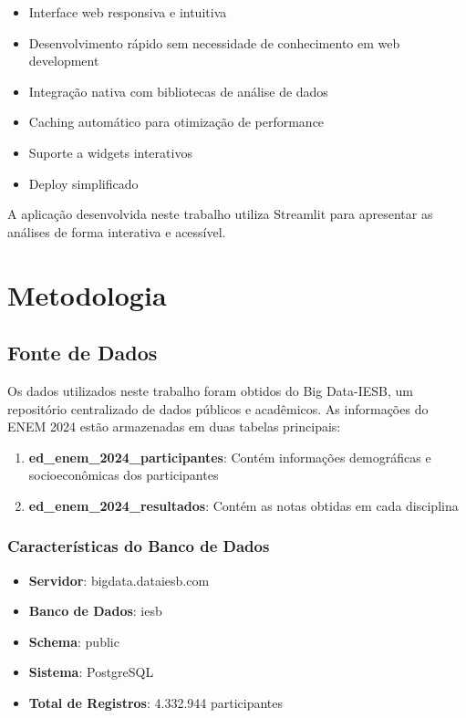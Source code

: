 \documentclass[12pt,a4paper]{article}
\begin{document}
\begin{itemize}
    \item Interface web responsiva e intuitiva
    \item Desenvolvimento rápido sem necessidade de conhecimento em web development
    \item Integração nativa com bibliotecas de análise de dados
    \item Caching automático para otimização de performance
    \item Suporte a widgets interativos
    \item Deploy simplificado
\end{itemize}

A aplicação desenvolvida neste trabalho utiliza Streamlit para apresentar as análises de forma interativa e acessível.

\newpage

\section{Metodologia}

\subsection{Fonte de Dados}

Os dados utilizados neste trabalho foram obtidos do Big Data-IESB, um repositório centralizado de dados públicos e acadêmicos. As informações do ENEM 2024 estão armazenadas em duas tabelas principais:

\begin{enumerate}
    \item \textbf{ed\_enem\_2024\_participantes}: Contém informações demográficas e socioeconômicas dos participantes
    \item \textbf{ed\_enem\_2024\_resultados}: Contém as notas obtidas em cada disciplina
\end{enumerate}

\subsubsection{Características do Banco de Dados}

\begin{itemize}
    \item \textbf{Servidor}: bigdata.dataiesb.com
    \item \textbf{Banco de Dados}: iesb
    \item \textbf{Schema}: public
    \item \textbf{Sistema}: PostgreSQL
    \item \textbf{Total de Registros}: 4.332.944 participantes
\end{itemize}
\end{document}
